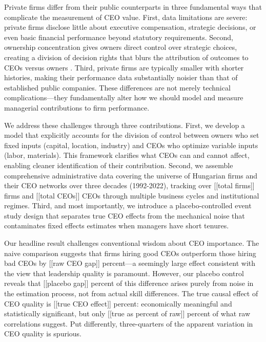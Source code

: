 \documentclass[11pt,a4paper]{article}
\begin{document}
Private firms differ from their public counterparts in three fundamental ways that complicate the measurement of CEO value. First, data limitations are severe: private firms disclose little about executive compensation, strategic decisions, or even basic financial performance beyond statutory requirements. Second, ownership concentration gives owners direct control over strategic choices, creating a division of decision rights that blurs the attribution of outcomes to CEOs versus owners \citep{fama1983separation, jensen1976theory, burkart2003family}. Third, private firms are typically smaller with shorter histories, making their performance data substantially noisier than that of established public companies. These differences are not merely technical complications—they fundamentally alter how we should model and measure managerial contributions to firm performance.

We address these challenges through three contributions. First, we develop a model that explicitly accounts for the division of control between owners who set fixed inputs (capital, location, industry) and CEOs who optimize variable inputs (labor, materials). This framework clarifies what CEOs can and cannot affect, enabling cleaner identification of their contribution. Second, we assemble comprehensive administrative data covering the universe of Hungarian firms and their CEO networks over three decades (1992-2022), tracking over [[total firms]] firms and [[total CEOs]] CEOs through multiple business cycles and institutional regimes. Third, and most importantly, we introduce a placebo-controlled event study design that separates true CEO effects from the mechanical noise that contaminates fixed effects estimates when managers have short tenures.

Our headline result challenges conventional wisdom about CEO importance. The naive comparison suggests that firms hiring good CEOs outperform those hiring bad CEOs by [[raw CEO gap]] percent—a seemingly large effect consistent with the view that leadership quality is paramount. However, our placebo control reveals that [[placebo gap]] percent of this difference arises purely from noise in the estimation process, not from actual skill differences. The true causal effect of CEO quality is [[true CEO effect]] percent: economically meaningful and statistically significant, but only [[true as percent of raw]] percent of what raw correlations suggest. Put differently, three-quarters of the apparent variation in CEO quality is spurious.
\end{document}
